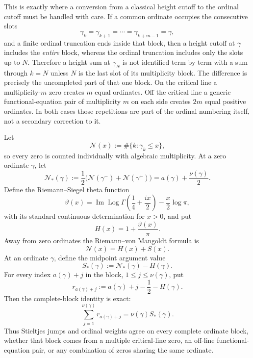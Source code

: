 \documentclass[11pt]{amsart}
\numberwithin{equation}{section}
\theoremstyle{definition}
\theoremstyle{remark}
\newcommand{\Log}{\operatorname{Log}}
\begin{document}
This is exactly where a conversion from a classical height cutoff to the ordinal cutoff must be handled with care. If a common ordinate occupies the consecutive slots
\[
\gamma_k=\gamma_{k+1}=\cdots=\gamma_{k+m-1}=\gamma,
\]
and a finite ordinal truncation ends inside that block, then a height cutoff at \(\gamma\) includes the \emph{entire} block, whereas the ordinal truncation includes only the slots up to \(N\). Therefore a height sum at \(\gamma_N\) is not identified term by term with a sum through \(k=N\) unless \(N\) is the last slot of its multiplicity block. The difference is precisely the uncompleted part of that one block. On the critical line a multiplicity-\(m\) zero creates \(m\) equal ordinates. Off the critical line a generic functional-equation pair of multiplicity \(m\) on each side creates \(2m\) equal positive ordinates. In both cases those repetitions are part of the ordinal numbering itself, not a secondary correction to it.

Let
\begin{equation}\label{eq:counting_function_mathcalN}
\mathcal N(x):=\#\{k:\gamma_k\le x\},
\end{equation}
so every zero is counted individually with algebraic multiplicity. At a zero ordinate \(\gamma\), let
\begin{equation}\label{eq:midpoint_count_mathcalN}
\mathcal N_*(\gamma)
:=\frac12\bigl(\mathcal N(\gamma^-)+\mathcal N(\gamma^+)\bigr)
=a(\gamma)+\frac{\nu(\gamma)}2.
\end{equation}
Define the Riemann--Siegel theta function
\[
\vartheta(x)=\operatorname{Im}\Log\Gamma\!\left(\frac14+\frac{ix}{2}\right)-\frac x2\log\pi,
\]
with its standard continuous determination for \(x>0\), and put
\[
H(x)=1+\frac{\vartheta(x)}{\pi}.
\]
Away from zero ordinates the Riemann--von Mangoldt formula is
\begin{equation}\label{eq:RVM_counting_mathcalN}
\mathcal N(x)=H(x)+S(x).
\end{equation}
At an ordinate \(\gamma\), define the midpoint argument value
\begin{equation}\label{eq:midpoint}
S_*(\gamma):=\mathcal N_*(\gamma)-H(\gamma).
\end{equation}
For every index \(a(\gamma)+j\) in the block, \(1\le j\le\nu(\gamma)\), put
\begin{equation}\label{eq:ordinal_defect_block}
r_{a(\gamma)+j}:=a(\gamma)+j-\frac12-H(\gamma).
\end{equation}
Then the complete-block identity is exact:
\begin{equation}\label{eq:ordinal_defect_block_sum}
\boxed{
\sum_{j=1}^{\nu(\gamma)}r_{a(\gamma)+j}
=\nu(\gamma)S_*(\gamma).}
\end{equation}
Thus Stieltjes jumps and ordinal weights agree on every complete ordinate block, whether that block comes from a multiple critical-line zero, an off-line functional-equation pair, or any combination of zeros sharing the same ordinate.
\end{document}
